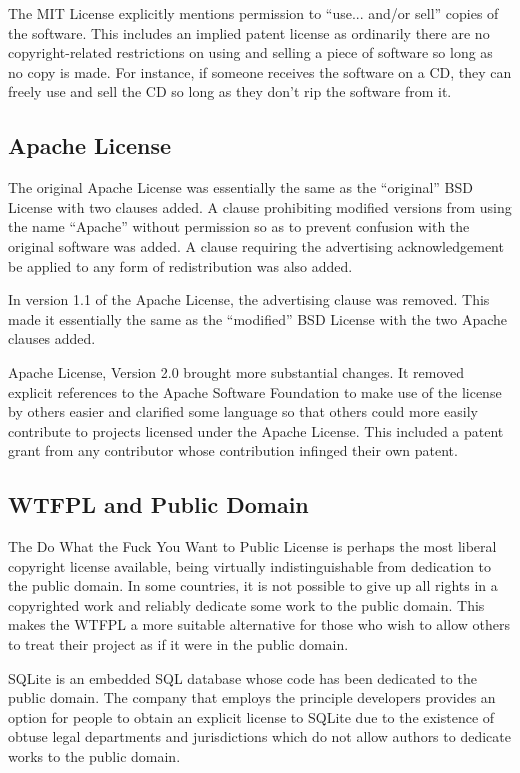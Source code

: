 \documentclass[12pt,letterpaper]{article}
\begin{document}
The MIT License explicitly mentions permission to ``use... and/or sell'' copies of the software. This includes an implied patent license as ordinarily there are no copyright-related restrictions on using and selling a piece of software so long as no copy is made.\cite{boost} For instance, if someone receives the software on a CD, they can freely use and sell the CD so long as they don't rip the software from it.\cite{copyright}

\subsection{Apache License}

The original Apache License was essentially the same as the ``original'' BSD License with two clauses added. A clause prohibiting modified versions from using the name ``Apache'' without permission so as to prevent confusion with the original software was added. A clause requiring the advertising acknowledgement be applied to any form of redistribution was also added.\cite{apache1}

In version 1.1 of the Apache License, the advertising clause was removed. This made it essentially the same as the ``modified'' BSD License with the two Apache clauses added.\cite{apache11}

Apache License, Version 2.0 brought more substantial changes. It removed explicit references to the Apache Software Foundation to make use of the license by others easier and clarified some language so that others could more easily contribute to projects licensed under the Apache License. This included a patent grant from any contributor whose contribution infinged their own patent.\cite{apache2}

\subsection{WTFPL and Public Domain}

The Do What the Fuck You Want to Public License is perhaps the most liberal copyright license available, being virtually indistinguishable from dedication to the public domain. In some countries, it is not possible to give up all rights in a copyrighted work and reliably dedicate some work to the public domain. This makes the WTFPL a more suitable alternative for those who wish to allow others to treat their project as if it were in the public domain.\cite{wtfpl}

SQLite is an embedded SQL database whose code has been dedicated to the public domain. The company that employs the principle developers provides an option for people to obtain an explicit license to SQLite due to the existence of obtuse legal departments and jurisdictions which do not allow authors to dedicate works to the public domain.\cite{sqlite}
\end{document}
